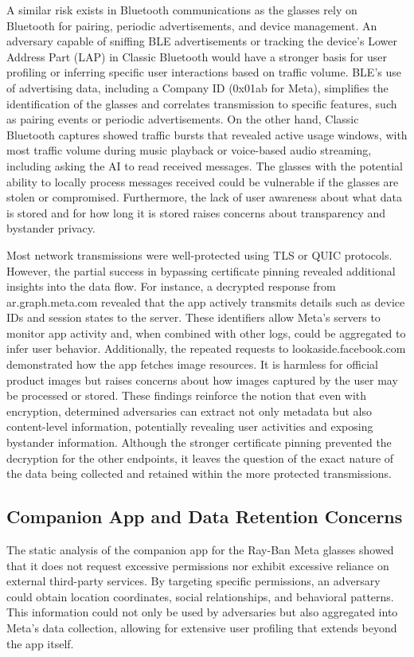 A similar risk exists in Bluetooth communications as the glasses rely on Bluetooth for pairing, periodic advertisements, and device management. An adversary capable of sniffing BLE advertisements or tracking the device's Lower Address Part (LAP) in Classic Bluetooth would have a stronger basis for user profiling or inferring specific user interactions based on traffic volume. BLE's use of advertising data, including a Company ID (0x01ab for Meta), simplifies the identification of the glasses and correlates transmission to specific features, such as pairing events or periodic advertisements. On the other hand, Classic Bluetooth captures showed traffic bursts that revealed active usage windows, with most traffic volume during music playback or voice-based audio streaming, including asking the AI to read received messages. The glasses with the potential ability to locally process messages received could be vulnerable if the glasses are stolen or compromised. Furthermore, the lack of user awareness about what data is stored and for how long it is stored raises concerns about transparency and bystander privacy.

Most network transmissions were well-protected using TLS or QUIC protocols. However, the partial success in bypassing certificate pinning revealed additional insights into the data flow. For instance, a decrypted response from ar.graph.meta.com revealed that the app actively transmits details such as device IDs and session states to the server. These identifiers allow Meta's servers to monitor app activity and, when combined with other logs, could be aggregated to infer user behavior. Additionally, the repeated requests to lookaside.facebook.com demonstrated how the app fetches image resources. It is harmless for official product images but raises concerns about how images captured by the user may be processed or stored. These findings reinforce the notion that even with encryption, determined adversaries can extract not only metadata but also content-level information, potentially revealing user activities and exposing bystander information. Although the stronger certificate pinning prevented the decryption for the other endpoints, it leaves the question of the exact nature of the data being collected and retained within the more protected transmissions.



\subsection*{Companion App and Data Retention Concerns}
The static analysis of the companion app for the Ray-Ban Meta glasses showed that it does not request excessive permissions nor exhibit excessive reliance on external third-party services. By targeting specific permissions, an adversary could obtain location coordinates, social relationships, and behavioral patterns. This information could not only be used by adversaries but also aggregated into Meta's data collection, allowing for extensive user profiling that extends beyond the app itself.

